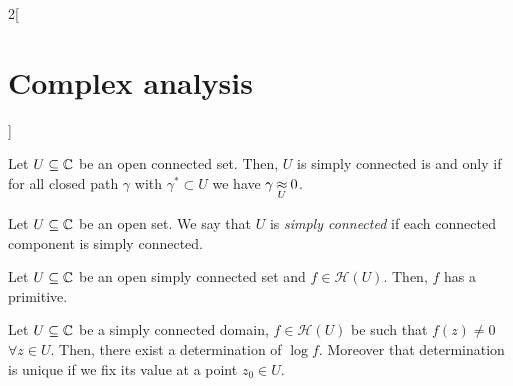 \documentclass[../../../main_math.tex]{subfiles}
\begin{document}
\begin{multicols}{2}[\section{Complex analysis}]
\begin{proposition}
    Let $U\subseteq\mathbb{C}$ be an open connected set. Then, $U$ is simply connected is and only if for all closed path $\gamma$ with $\gamma^*\subset U$ we have $\gamma\mathbin{\underset{U}{\approx}}0$.
  \end{proposition}
  \begin{definition}
    Let $U\subseteq\mathbb{C}$ be an open set. We say that $U$ is \emph{simply connected} if each connected component is simply connected.
  \end{definition}
  \begin{theorem}
    Let $U\subseteq\mathbb{C}$ be an open simply connected set and $f\in\mathcal{H}(U)$. Then, $f$ has a primitive.
  \end{theorem}
  \begin{theorem}
    Let $U\subseteq\mathbb{C}$ be a simply connected domain, $f\in\mathcal{H}(U)$ be such that $f(z)\ne 0$ $\forall z\in U$. Then, there exist a determination of $\log f$. Moreover that determination is unique if we fix its value at a point $z_0\in U$.
  \end{theorem}

\end{multicols}
\end{document}
